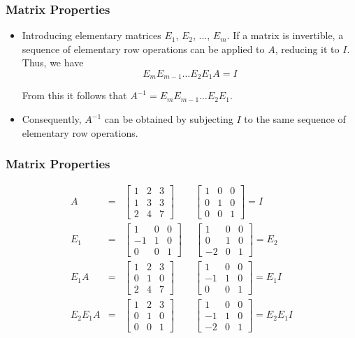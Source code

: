 \documentclass[notheorems,mathserif,table,compress]{beamer}  %
\begin{document}
\begin{frame}
\frametitle{Matrix Properties}
\begin{itemize}
\item Introducing elementary matrices $E_1$, $E_2$, $\ldots$, $E_m$. If a matrix is invertible, a sequence of elementary row operations can be applied to $A$, reducing it to $I$. Thus, we have 
\begin{displaymath}
E_mE_{m-1}\ldots E_2E_1A=I
\end{displaymath}

From this it follows that $A^{-1}=E_mE_{m-1}\ldots E_2E_1$. 
\item Consequently, $A^{-1}$ can be obtained by subjecting $I$ to the same sequence of elementary row operations.
\end{itemize}
\end{frame}

\begin{frame}
\frametitle{Matrix Properties}
\begin{eqnarray*}
A&=&
\begin{bmatrix}
1 & 2 & 3\\
1 & 3 & 3\\
2 & 4 & 7
\end{bmatrix} \qquad
\begin{bmatrix}
1 & 0 & 0\\
0 & 1 & 0\\
0 & 0 & 1
\end{bmatrix} 
=I\\
E_1&=&
\begin{bmatrix}
1 & 0 & 0\\
-1 & 1 & 0\\
0 & 0 & 1
\end{bmatrix} \quad \;
\begin{bmatrix}
1 & 0 & 0\\
0 & 1 & 0\\
-2 & 0 & 1
\end{bmatrix}
=E_2\\
E_1A&=&
\begin{bmatrix}
1 & 2 & 3\\
0 & 1 & 0\\
2 & 4 & 7
\end{bmatrix} \qquad
\begin{bmatrix}
1 & 0 & 0\\
-1 & 1 & 0\\
0 & 0 & 1
\end{bmatrix} 
=E_1I\\
E_2E_1A&=&
\begin{bmatrix}
1 & 2 & 3\\
0 & 1 & 0\\
0 & 0 & 1
\end{bmatrix} \qquad
\begin{bmatrix}
1 & 0 & 0\\
-1 & 1 & 0\\
-2 & 0 & 1
\end{bmatrix} 
=E_2E_1I
\end{eqnarray*}

\end{frame}
\end{document}
